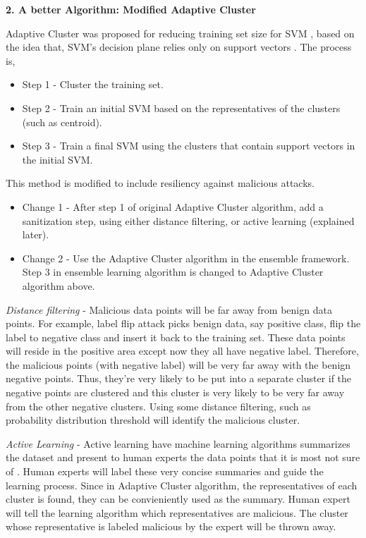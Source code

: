 \documentclass[10pt,conference,compsocconf,letterpaper]{IEEEtran}
\begin{document}
\textbf{2. A better Algorithm: Modified Adaptive Cluster}

Adaptive Cluster was proposed for reducing training set size for SVM \cite{boley04, hwanjo03}, based on the idea that, SVM's decision plane relies only on support vectors \cite{koggalage04}. The process is, 

\begin{itemize}
\item Step 1 - Cluster the training set.
\item Step 2 - Train an initial SVM based on the representatives of the clusters (such as centroid).
\item Step 3 - Train a final SVM using the clusters that contain support vectors in the initial SVM.
\end{itemize}

This method is modified to include resiliency against malicious attacks.

\begin{itemize}
\item Change 1 - After step 1 of original Adaptive Cluster algorithm, add a sanitization step, using either distance filtering, or active learning (explained later).
\item Change 2 - Use the Adaptive Cluster algorithm in the ensemble framework. Step 3 in ensemble learning algorithm is changed to Adaptive Cluster algorithm above.
\end{itemize}

\textit{Distance filtering} - Malicious data points will be far away from benign data points. For example, label flip attack \cite{xiao12} picks benign data, say positive class, flip the label to negative class and insert it back to the training set. These data points will reside in the positive area except now they all have negative label. Therefore, the malicious points (with negative label) will be very far away with the benign negative points. Thus, they're very likely to be put into a separate cluster if the negative points are clustered and this cluster is very likely to be very far away from the other negative clusters. Using some distance filtering, such as probability distribution threshold will identify the malicious cluster.

\textit{Active Learning} - Active learning have machine learning algorithms summarizes the dataset and present to human experts the data points that it is most not sure of \cite{reghavan06}. Human experts will label these very concise summaries and guide the learning process. Since in Adaptive Cluster algorithm, the representatives of each cluster is found, they can be convieniently used as the summary. Human expert will tell the learning algorithm which representatives are malicious. The cluster whose representative is labeled malicious by the expert will be thrown away.
\end{document}
